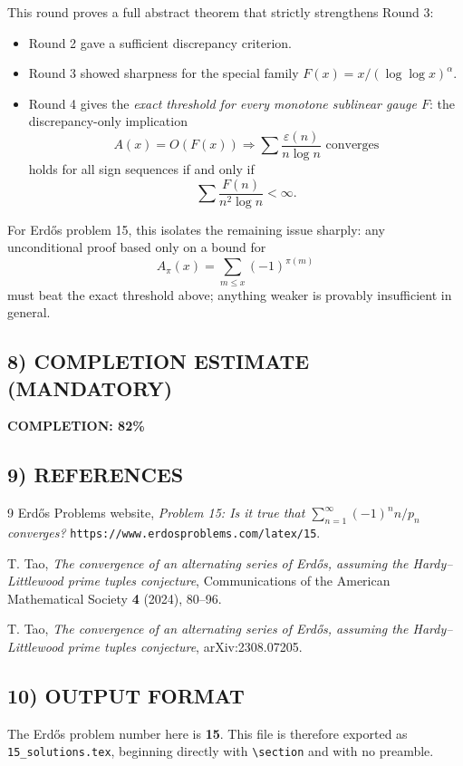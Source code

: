 This round proves a full abstract theorem that strictly strengthens Round 3:
\begin{itemize}
\item Round 2 gave a sufficient discrepancy criterion.
\item Round 3 showed sharpness for the special family $F(x)=x/(\log\log x)^\alpha$.
\item Round 4 gives the \emph{exact threshold for every monotone sublinear gauge $F$}: the discrepancy-only implication
\[
A(x)=O(F(x))\Longrightarrow \sum \frac{\varepsilon(n)}{n\log n}\text{ converges}
\]
holds for all sign sequences if and only if
\[
\sum \frac{F(n)}{n^2\log n}<\infty.
\]
\end{itemize}

For Erd\H{o}s problem 15, this isolates the remaining issue sharply: any unconditional proof based only on a bound for
\[
A_\pi(x)=\sum_{m\le x}(-1)^{\pi(m)}
\]
must beat the exact threshold above; anything weaker is provably insufficient in general.

\subsection{8) COMPLETION ESTIMATE (MANDATORY)}

\noindent\textbf{COMPLETION: 82\%}

\subsection{9) REFERENCES}

\begin{thebibliography}{9}
Erd\H{o}s Problems website,
\emph{Problem 15: Is it true that $\sum_{n=1}^\infty (-1)^n n/p_n$ converges?}
\texttt{https://www.erdosproblems.com/latex/15}.

T. Tao,
\emph{The convergence of an alternating series of Erd\H{o}s, assuming the Hardy--Littlewood prime tuples conjecture},
Communications of the American Mathematical Society \textbf{4} (2024), 80--96.

T. Tao,
\emph{The convergence of an alternating series of Erd\H{o}s, assuming the Hardy--Littlewood prime tuples conjecture},
arXiv:2308.07205.
\end{thebibliography}

\subsection{10) OUTPUT FORMAT}

The Erd\H{o}s problem number here is \textbf{15}.  This file is therefore exported as \texttt{15\_solutions.tex}, beginning directly with \verb|\section| and with no preamble.
